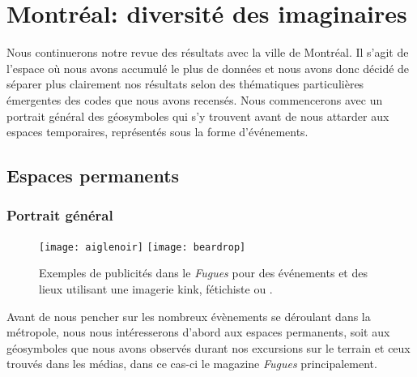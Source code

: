 \section{Montréal: diversité des imaginaires}
\label{sec:montr_al_diversit_des_imaginaires}
Nous continuerons notre revue des résultats avec la ville de Montréal.
Il s'agit de l'espace où nous avons accumulé le plus de données et nous avons donc décidé de séparer plus clairement nos résultats selon des thématiques particulières émergentes des codes que nous avons recensés.
Nous commencerons avec un portrait général des géosymboles qui s'y trouvent avant de nous attarder aux espaces temporaires, représentés sous la forme d'événements.

\subsection{Espaces permanents}
\subsubsection{Portrait général}
\label{subsec:portraitgeneralmtl}

\begin{figure}[ht]
  \centering
  {\texttt{[image: aiglenoir]}}
  {\texttt{[image: beardrop]}}
  \caption[Publicités utilisant une imagerie \textsc{bdsm}]{Exemples de publicités dans le \emph{Fugues} pour des événements et des lieux utilisant une imagerie kink, fétichiste ou \bdsm{}.}\label{figs:fetichisme}
\end{figure}

Avant de nous pencher sur les nombreux évènements se déroulant dans la métropole, nous nous intéresserons d'abord aux espaces permanents, soit aux géosymboles que nous avons observés durant nos excursions sur le terrain et ceux trouvés dans les médias, dans ce cas-ci le magazine \emph{Fugues} principalement.

